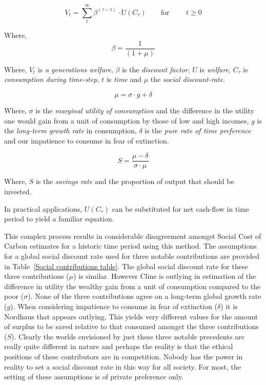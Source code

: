 \documentclass[11pt, oneside]{book}   	%
\begin{document}
\begin{equation}
V_t = \sum_t^\infty \beta^{(\tau - t)} \cdot U (C_\tau)
\qquad \text{for }
\qquad t \geq 0
\end{equation}

Where,
\begin{equation}
\beta = \frac{1}{(1+\mu)}
\end{equation}

Where, $V_t$ is \emph{a generations welfare}, $\beta$ is the \emph{discount factor}, $U$ is \emph{welfare}, $C_\tau$ is \emph{consumption during time-step}, $t$ is \emph{time} and $\mu$ the \emph{social discount-rate}.

\begin{equation}
\mu = \sigma \cdot g + \delta
\end{equation}

Where, $\sigma$ is the \emph{marginal utility of consumption} and the difference in the utility one would gain from a unit of consumption by those of low and high incomes, $g$ is the \emph{long-term growth rate} in consumption, $\delta$ is the \emph{pure rate of time preference} and our impatience to consume in fear of extinction.

\begin{equation}
S = \frac{\mu-\delta}{\sigma \cdot \mu}
\end{equation}

Where, $S$ is the \emph{savings rate} and the proportion of output that should be invested.\par

In practical applications, $U (C_\tau)$ can be substituted for net cash-flow in time period to yield a familiar equation.\par

This complex process results in considerable disagreement amongst Social Cost of Carbon estimates for a historic time period using this method.
The assumptions for a global social discount rate used for three notable contributions are provided in Table~\ref{Social contributions table}.
The global social discount rate for these three contributions ($\mu$) is similar. However Cline is outlying in estimation of the difference in utility the wealthy gain from a unit of consumption compared to the poor ($\sigma$). None of the three contributions agree on a long-term global growth rate ($g$). When considering impatience to consume in fear of extinction ($\delta$) it is Nordhaus that appears outlying. This yields very different values for the amount of surplus to be saved relative to that consumed amongst the three contributions ($S$). Clearly the worlds envisioned by just these three notable precedents are really quite different in nature and perhaps the reality is that the ethical positions of these contributors are in competition. Nobody has the power in reality to set a social discount rate in this way for all society. For most, the setting of these assumptions is of private preference only.
\end{document}
